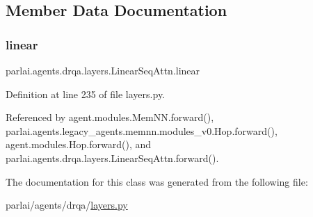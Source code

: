 \subsection{Member Data Documentation}
\mbox{\label{classparlai_1_1agents_1_1drqa_1_1layers_1_1LinearSeqAttn_a5e221c809306db7c5877e5f6f919ac7f}} 
\subsubsection{\texorpdfstring{linear}{linear}}
{\footnotesize\ttfamily parlai.\+agents.\+drqa.\+layers.\+Linear\+Seq\+Attn.\+linear}



Definition at line 235 of file layers.\+py.



Referenced by agent.\+modules.\+Mem\+N\+N.\+forward(), parlai.\+agents.\+legacy\+\_\+agents.\+memnn.\+modules\+\_\+v0.\+Hop.\+forward(), agent.\+modules.\+Hop.\+forward(), and parlai.\+agents.\+drqa.\+layers.\+Linear\+Seq\+Attn.\+forward().



The documentation for this class was generated from the following file\+:\begin{DoxyCompactItemize}
\item 
parlai/agents/drqa/\hyperlink{layers_8py}{layers.\+py}\end{DoxyCompactItemize}
